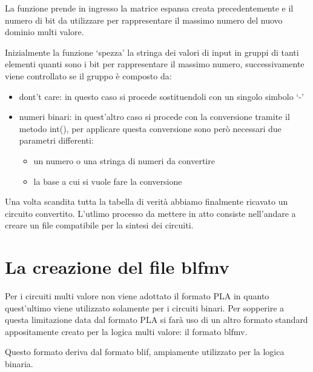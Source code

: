 \documentclass[italian,]{book}
\providecommand{\tightlist}{%
  \setlength{\itemsep}{0pt}\setlength{\parskip}{0pt}}
\begin{document}
La funzione prende in ingresso la matrice espansa creata precedentemente e il numero di bit da utilizzare per rappresentare il massimo numero del nuovo dominio multi valore.

\newpage

Inizialmente la funzione `spezza' la stringa dei valori di input in gruppi di tanti elementi quanti sono i bit per rappresentare il massimo numero, successivamente viene controllato se il gruppo è composto da:

\begin{itemize}
\tightlist
\item
  dont't care: in questo caso si procede sostituendoli con un singolo simbolo `-'
\item
  numeri binari: in quest'altro caso si procede con la conversione tramite il metodo int(), per applicare questa conversione sono però necessari due parametri differenti:

  \begin{itemize}
  \tightlist
  \item
    un numero o una stringa di numeri da convertire
  \item
    la base a cui si vuole fare la conversione
  \end{itemize}
\end{itemize}

Una volta scandita tutta la tabella di verità abbiamo finalmente ricavato un circuito convertito. L'utlimo processo da mettere in atto consiste nell'andare a creare un file compatibile per la sintesi dei circuiti.

\hypertarget{la-creazione-del-file-blfmv}{%
\section{La creazione del file blfmv}\label{la-creazione-del-file-blfmv}}

Per i circuiti multi valore non viene adottato il formato PLA in quanto quest'ultimo viene utilizzato solamente per i circuiti binari. Per sopperire a questa limitazione data dal formato PLA si farà uso di un altro formato standard appositamente creato per la logica multi valore: il formato blfmv.

Questo formato deriva dal formato blif, ampiamente utilizzato per la logica binaria.
\end{document}
